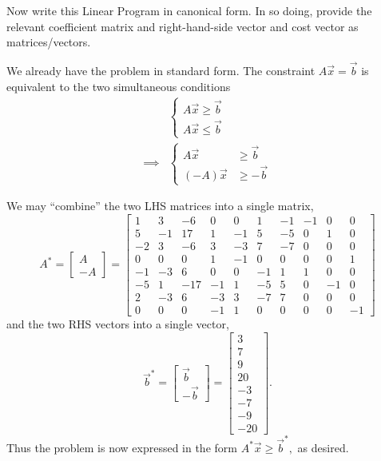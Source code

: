 \documentclass{article}
\begin{document}
\begin{itemize}
\begin{enumerate}[a)]
\begin{soln}
			\end{soln}

			\ii Now write this Linear Program in canonical form. In so doing, provide the relevant coefficient matrix and right-hand-side vector and cost vector as matrices/vectors.
			\begin{soln}
				We already have the problem in standard form. The constraint $A\vec{x}=\vec{b}$ is equivalent to the two simultaneous conditions 
				\begin{align*}
					&\begin{cases}
						A\vec{x}\ge \vec{b} \\
						A\vec{x} \le \vec{b}
					\end{cases} \\
					\implies&\begin{cases}
						A\vec{x} &\ge \vec{b} \\
						(-A)\vec{x} &\ge -\vec{b}
					\end{cases}
				\end{align*}

				We may ``combine'' the two LHS matrices into a single matrix, 
				\[A^*=\begin{bmatrix}
					A \\ -A
				\end{bmatrix} = 
				\begin{bmatrix}
					1 & 3 & -6 & 0 & 0 & 1 & -1 & -1 & 0 & 0 \\
					5 & -1 & 17 & 1 & -1 & 5 & -5 & 0 & 1 & 0 \\
					-2 & 3 & -6 & 3 & -3 & 7 & -7 & 0 & 0 & 0 \\
					0 & 0 & 0 & 1 & -1 & 0 & 0 & 0 & 0 & 1 \\
					-1 & -3 & 6 & 0 & 0 & -1 & 1 & 1 & 0 & 0 \\
					-5 & 1 & -17 & -1 & 1 & -5 & 5 & 0 & -1 & 0 \\
					2 & -3 & 6 & -3 & 3 & -7 & 7 & 0 & 0 & 0 \\
					0 & 0 & 0 & -1 & 1 & 0 & 0 & 0 & 0 & -1
				\end{bmatrix}\] and the two RHS vectors into a single vector, 
				\[\vec{b}^*=\begin{bmatrix}
					\vec{b} \\ -\vec{b}
				\end{bmatrix} = 
				\begin{bmatrix}
					3 \\ 7 \\ 9 \\ 20 \\ -3 \\ -7 \\ -9 \\ -20
			\end{bmatrix}.\] Thus the problem is now expressed in the form $A^*\vec{x}\ge\vec{b}^*,$ as desired.
			\end{soln}
			

\end{enumerate}
\end{itemize}
\end{document}
